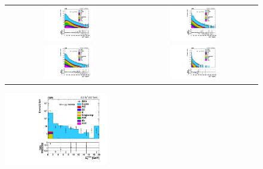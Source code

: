 \begin{figure}[!ht]
\begin{center}
\begin{tabular}{cc}
\includegraphics[width=0.4\textwidth]{MET/figs/h_met_chpfcands_0013_pt_ll_signalregion_inclusive_passtrig.pdf} &
\includegraphics[width=0.4\textwidth]{MET/figs/h_met_chpfcands_1316_pt_ll_signalregion_inclusive_passtrig.pdf} \\
\includegraphics[width=0.4\textwidth]{MET/figs/h_met_chpfcands_1624_pt_ll_signalregion_inclusive_passtrig.pdf} &
\includegraphics[width=0.4\textwidth]{MET/figs/h_met_chpfcands_2430_pt_ll_signalregion_inclusive_passtrig.pdf} \\
\end{tabular}
\includegraphics[width=0.4\textwidth]{MET/figs/h_met_chpfcands_30in_pt_ll_signalregion_inclusive_passtrig.pdf} 

\end{center}
\end{figure}
